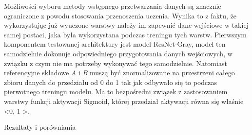   Możliwości wyboru metody wstępnego przetwarzania danych są znacznie ograniczone
  z powodu stosowania przenoszenia uczenia. Wynika to z faktu, że wykorzystując
  już wyuczone warstwy należy im zapewnić dane wejściowe w takiej samej postaci,
  jaka była wykorzystana podczas treningu tych warstw. Pierwszym komponentem
  testowanej architektury jest model ResNet-Gray, model ten
  samodzielnie dokonuje odpowiedniego przygotowania danych wejściowych, w związku
  z czym nie ma potrzeby wykonywać tego samodzielnie. Natomiast referencyjne
  składowe \textit{A} i \textit{B} muszą być znormalizowane na przestrzeni
  całego zbioru danych do przedziału od
  0 do 1 tak jak odbywało się to podczas pierwotnego treningu modelu. Ma to
  bezpośredni związek z zastosowaniem warstwy funkcji aktywacji Sigmoid, której
  przedział aktywacji równa się właśnie \textless 0, 1 \textgreater.

  Rezultaty i porówniania

